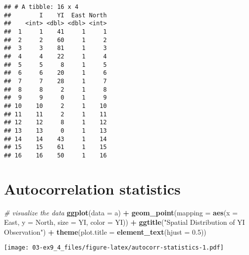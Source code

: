 \documentclass[]{book}
\newenvironment{Shaded}{\begin{snugshade}}{\end{snugshade}}
\newcommand{\CommentTok}[1]{\textcolor[rgb]{0.56,0.35,0.01}{\textit{#1}}}
\newcommand{\DataTypeTok}[1]{\textcolor[rgb]{0.13,0.29,0.53}{#1}}
\newcommand{\FloatTok}[1]{\textcolor[rgb]{0.00,0.00,0.81}{#1}}
\newcommand{\KeywordTok}[1]{\textcolor[rgb]{0.13,0.29,0.53}{\textbf{#1}}}
\newcommand{\NormalTok}[1]{#1}
\newcommand{\OperatorTok}[1]{\textcolor[rgb]{0.81,0.36,0.00}{\textbf{#1}}}
\newcommand{\StringTok}[1]{\textcolor[rgb]{0.31,0.60,0.02}{#1}}
\begin{document}
\begin{verbatim}
## # A tibble: 16 x 4
##        I    YI  East North
##    <int> <dbl> <dbl> <int>
##  1     1    41     1     1
##  2     2    60     1     2
##  3     3    81     1     3
##  4     4    22     1     4
##  5     5     8     1     5
##  6     6    20     1     6
##  7     7    28     1     7
##  8     8     2     1     8
##  9     9     0     1     9
## 10    10     2     1    10
## 11    11     2     1    11
## 12    12     8     1    12
## 13    13     0     1    13
## 14    14    43     1    14
## 15    15    61     1    15
## 16    16    50     1    16
\end{verbatim}

\hypertarget{autocorrelation-statistics}{%
\section{Autocorrelation statistics}\label{autocorrelation-statistics}}

\begin{Shaded}
\begin{Highlighting}[]
\CommentTok{# visualize the data}
\KeywordTok{ggplot}\NormalTok{(}\DataTypeTok{data =}\NormalTok{ a) }\OperatorTok{+}
\StringTok{  }\KeywordTok{geom_point}\NormalTok{(}\DataTypeTok{mapping =} \KeywordTok{aes}\NormalTok{(}\DataTypeTok{x =}\NormalTok{ East, }\DataTypeTok{y =}\NormalTok{ North, }\DataTypeTok{size =}\NormalTok{ YI, }\DataTypeTok{color =}\NormalTok{ YI)) }\OperatorTok{+}
\StringTok{  }\KeywordTok{ggtitle}\NormalTok{(}\StringTok{"Spatial Distribution of YI Observation"}\NormalTok{) }\OperatorTok{+}
\StringTok{  }\KeywordTok{theme}\NormalTok{(}\DataTypeTok{plot.title =} \KeywordTok{element_text}\NormalTok{(}\DataTypeTok{hjust =} \FloatTok{0.5}\NormalTok{))}
\end{Highlighting}
\end{Shaded}

\texttt{[image: 03-ex9\_4\_files/figure-latex/autocorr-statistics-1.pdf]}
\end{document}
